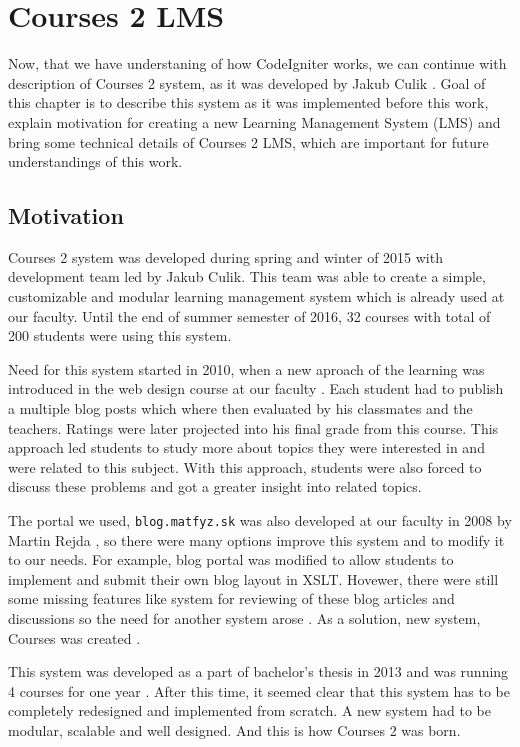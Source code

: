 \chapter{Courses 2 LMS}
\label{sec:courses}

Now, that we have understaning of how CodeIgniter works, we can continue with description of Courses 2 system, as it was developed by Jakub Culik \cite{culik}. Goal of this chapter is to describe this system as it was implemented before this work, explain motivation for creating a new Learning Management System (LMS) and bring some technical details of Courses 2 LMS, which are important for future understandings of this work.

\section{Motivation}

Courses 2 system was developed during spring and winter of 2015 with development team led by Jakub Culik. This team was able to create a simple, customizable and modular learning management system which is already used at our faculty. Until the end of summer semester of 2016, 32 courses with total of 200 students were using this system.


Need for this system started in 2010, when a new aproach of the learning was introduced in the web design course at our faculty \cite{culik}. Each student had to publish a multiple blog posts which where then evaluated by his classmates and  the teachers. Ratings were later projected into his final grade from this course. This approach led students to study more about topics they were interested in and were related to this subject. With this approach, students were also forced to discuss these problems and got a greater insight into related topics.

The portal we used, \texttt{blog.matfyz.sk} was also developed at our faculty in 2008 by Martin Rejda \cite{rejda}, so there were many options improve this system and to modify it to our needs. For example, blog portal was modified to allow students to implement and submit their own blog layout in XSLT. Hovewer, there were still some missing features like system for reviewing of these blog articles and discussions so the need for another system arose \cite{culik}. As a solution, new system, Courses was created \cite{culikbc}.


This system was developed as a part of bachelor's thesis in 2013 \cite{culikbc} and was running 4 courses for one year \cite{culik}. After this time, it seemed clear that this system has to be completely redesigned and implemented from scratch. A new system had to be modular, scalable and well designed. And this is how Courses 2 was born.

